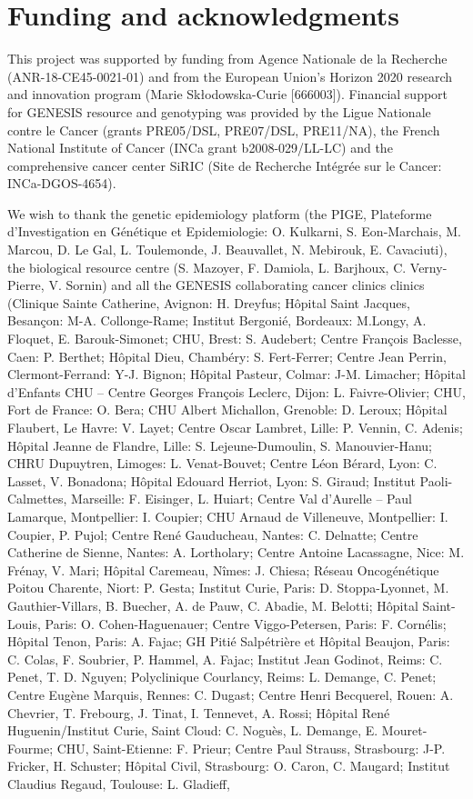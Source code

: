 \documentclass[twocolumn, 11pt, draft]{article}
\begin{document}
\section*{Funding and acknowledgments}

This project was supported by funding from Agence Nationale de la Recherche (ANR-18-CE45-0021-01) and from the European Union’s Horizon 2020 research and innovation program (Marie Skłodowska-Curie [666003]). Financial support for GENESIS resource and genotyping was provided by the Ligue Nationale contre le Cancer (grants PRE05/DSL, PRE07/DSL, PRE11/NA), the French National Institute of Cancer (INCa grant b2008-029/LL-LC) and the comprehensive cancer center SiRIC (Site de Recherche Intégrée sur le Cancer: INCa-DGOS-4654).

We wish to thank the genetic epidemiology platform (the PIGE, Plateforme d'Investigation en Génétique et Epidemiologie: O. Kulkarni, S. Eon-Marchais, M. Marcou, D. Le Gal, L. Toulemonde, J. Beauvallet, N. Mebirouk, E. Cavaciuti), the biological resource centre (S. Mazoyer, F. Damiola, L. Barjhoux, C. Verny-Pierre, V. Sornin) and all the GENESIS collaborating cancer clinics clinics (Clinique Sainte Catherine, Avignon: H. Dreyfus; Hôpital Saint Jacques, Besançon: M-A. Collonge-Rame; Institut Bergonié, Bordeaux: M.Longy, A. Floquet, E. Barouk-Simonet; CHU, Brest: S. Audebert; Centre François Baclesse, Caen: P. Berthet; Hôpital Dieu, Chambéry: S. Fert-Ferrer; Centre Jean Perrin, Clermont-Ferrand: Y-J. Bignon; Hôpital Pasteur, Colmar: J-M. Limacher; Hôpital d’Enfants CHU – Centre Georges François Leclerc, Dijon: L. Faivre-Olivier; CHU, Fort de France: O. Bera; CHU Albert Michallon, Grenoble: D. Leroux; Hôpital Flaubert, Le Havre: V. Layet; Centre Oscar Lambret, Lille: P. Vennin, C. Adenis; Hôpital Jeanne de Flandre, Lille: S. Lejeune-Dumoulin, S. Manouvier-Hanu; CHRU Dupuytren, Limoges: L. Venat-Bouvet; Centre Léon Bérard, Lyon: C. Lasset, V. Bonadona; Hôpital Edouard Herriot, Lyon: S. Giraud; Institut Paoli-Calmettes, Marseille: F. Eisinger, L. Huiart; Centre Val d’Aurelle – Paul Lamarque, Montpellier: I. Coupier; CHU Arnaud de Villeneuve, Montpellier: I. Coupier, P. Pujol; Centre René Gauducheau, Nantes: C. Delnatte; Centre Catherine de Sienne, Nantes: A. Lortholary; Centre Antoine Lacassagne, Nice: M. Frénay, V. Mari; Hôpital Caremeau, Nîmes: J. Chiesa; Réseau Oncogénétique Poitou Charente, Niort: P. Gesta; Institut Curie, Paris: D. Stoppa-Lyonnet, M. Gauthier-Villars, B. Buecher, A. de Pauw, C. Abadie, M. Belotti; Hôpital Saint-Louis, Paris: O. Cohen-Haguenauer; Centre Viggo-Petersen, Paris: F. Cornélis; Hôpital Tenon, Paris: A. Fajac; GH Pitié Salpétrière et Hôpital Beaujon, Paris: C. Colas, F. Soubrier, P. Hammel, A. Fajac; Institut Jean Godinot, Reims: C. Penet, T. D. Nguyen; Polyclinique Courlancy, Reims: L. Demange, C. Penet; Centre Eugène Marquis, Rennes: C. Dugast; Centre Henri Becquerel, Rouen: A. Chevrier, T. Frebourg, J. Tinat, I. Tennevet, A. Rossi; Hôpital René Huguenin/Institut Curie, Saint Cloud: C. Noguès, L. Demange, E. Mouret-Fourme; CHU, Saint-Etienne: F. Prieur; Centre Paul Strauss, Strasbourg: J-P. Fricker, H. Schuster; Hôpital Civil, Strasbourg: O. Caron, C. Maugard; Institut Claudius Regaud, Toulouse: L. Gladieff, 
\end{document}
